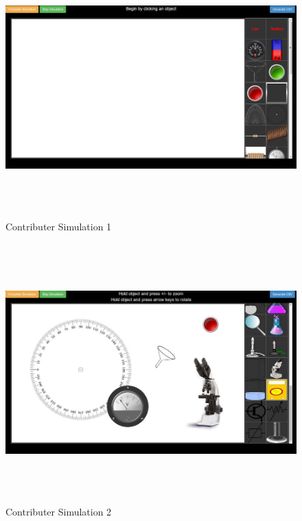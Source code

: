 \documentclass[12pt]{report}
\begin{document}
\begin{figure}[H]
 \centering 
 \includegraphics[width=15cm, height=10cm]{./323.jpg}
 \caption{Contributer Simulation 1\label{fig:323}}
\end{figure}
\begin{figure}[H]
 \centering 
 \includegraphics[width=15cm, height=10cm]{./324.jpg}
 \caption{Contributer Simulation 2\label{fig:324}}
\end{figure}
\end{document}
